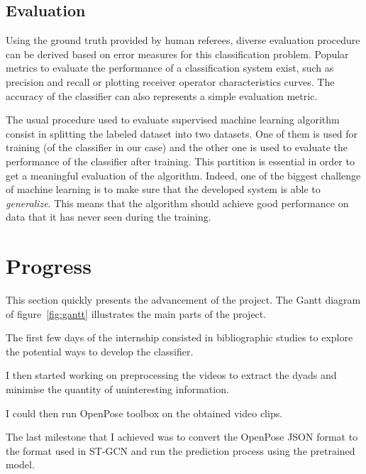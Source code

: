\documentclass[12pt,a4paper,twoside]{article}
\begin{document}
\subsection{Evaluation}
Using the ground truth provided by human referees, diverse evaluation procedure can be derived based on error measures for this classification problem. Popular metrics to evaluate the performance of a classification system exist, such as precision and recall  or plotting receiver operator characteristics curves. The accuracy of the classifier can also represents a simple evaluation metric.

The usual procedure used to evaluate supervised machine learning algorithm consist in splitting the labeled dataset into two datasets. One of them is used for training (of the classifier in our case) and the other one is used to evaluate the performance of the classifier after training. This partition is essential in order to get a meaningful evaluation of the algorithm. Indeed, one of the biggest challenge of machine learning is to make sure that the developed system is able to \textit{generalize}. This means that the algorithm should achieve good performance on data that it has never seen during the training.

\section{Progress}
This section quickly presents the advancement of the project. The Gantt diagram of figure~\ref{fig:gantt} illustrates the main parts of the project.

The first few days of the internship consisted in bibliographic studies to explore the potential ways to develop the classifier. 

I then started working on preprocessing the videos to extract the dyads and minimise the quantity of uninteresting information. 

I could then run OpenPose toolbox on the obtained video clips. 

The last milestone that I achieved was to convert the OpenPose JSON format to the format used in ST-GCN and run the prediction process using the pretrained model.
\end{document}
